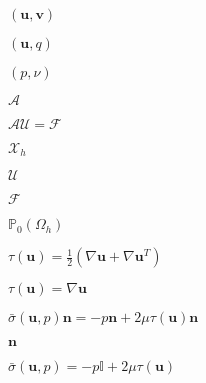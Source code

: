 \documentclass{article}
\begin{document}
$(\mathbf{u},\mathbf{v})$
\pagebreak

$(\mathbf{u},q)$
\pagebreak

$(p,\nu)$
\pagebreak

$\mathcal{A}$
\pagebreak

$\mathcal{A} \mathcal{U} = \mathcal{F}$
\pagebreak

$\mathcal{X}_h$
\pagebreak

$\mathcal{U}$
\pagebreak

$\mathcal{F}$
\pagebreak

$\mathbb{P}_0(\Omega_h)$
\pagebreak

$\tau(\mathbf{u}) = \frac{1}{2}(\nabla \mathbf{u} + \nabla \mathbf{u}^T)$
\pagebreak

$\tau(\mathbf{u}) = \nabla \mathbf{u}$
\pagebreak

$\bar{\sigma}(\mathbf{u},p) \mathbf{n} = -p \mathbf{n} + 2 \mu \tau(\mathbf{u}) \mathbf{n}$
\pagebreak

$\mathbf{n}$
\pagebreak

$\bar{\sigma}(\mathbf{u},p) = -p \mathbb{I} + 2 \mu \tau(\mathbf{u})$
\pagebreak
\end{document}
